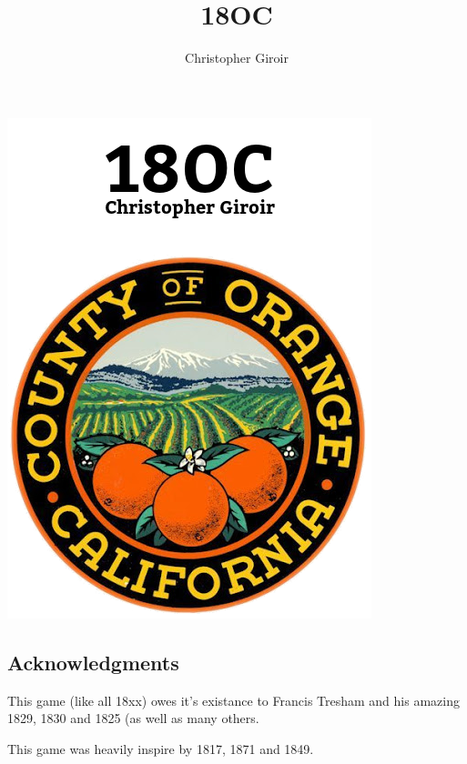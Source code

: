 \documentclass[letterpaper]{article}
\title{18OC}
\author{Christopher Giroir}
\begin{document}
\begin{titlepage}
  \begin{center}
    \includegraphics[width=\textwidth]{18OC.png}
  \end{center}
\end{titlepage}

\newpage
\tableofcontents
\newpage

\begin{multicols}{2}
    \section{Acknowledgments}

    This game (like all 18xx) owes it's existance to Francis Tresham and his
    amazing 1829, 1830 and 1825 (as well as many others.

    This game was heavily inspire by 1817, 1871 and 1849.
\end{multicols}
\end{document}
